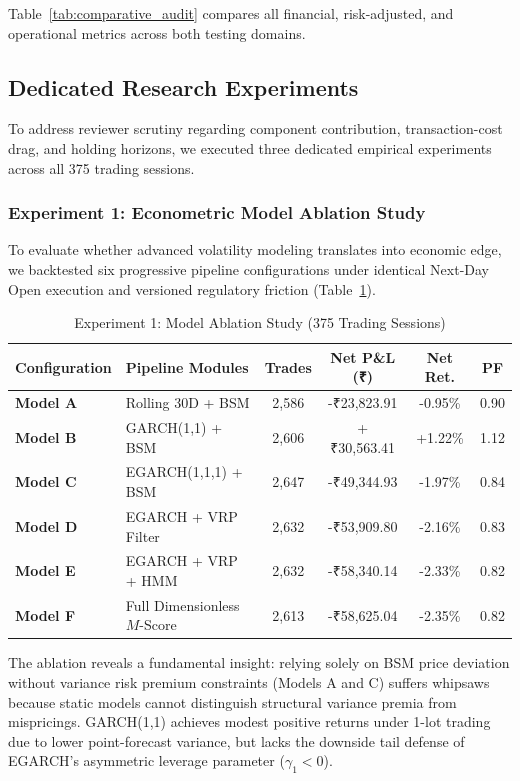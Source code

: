 \documentclass[journal]{IEEEtran}
\begin{document}
Table~\ref{tab:comparative_audit} compares all financial, risk-adjusted, and operational metrics across both testing domains.

\subsection{Dedicated Research Experiments}

To address reviewer scrutiny regarding component contribution, transaction-cost drag, and holding horizons, we executed three dedicated empirical experiments across all 375 trading sessions.

\subsubsection{Experiment 1: Econometric Model Ablation Study}
To evaluate whether advanced volatility modeling translates into economic edge, we backtested six progressive pipeline configurations under identical Next-Day Open execution and versioned regulatory friction (Table~\ref{tab:exp1_ablation}).

\begin{table}[!t]
\renewcommand{\arraystretch}{1.15}
\caption{Experiment 1: Model Ablation Study (375 Trading Sessions)}
\label{tab:exp1_ablation}
\centering
\scriptsize
\begin{tabular}{llcccc}
\toprule
\textbf{Configuration} & \textbf{Pipeline Modules} & \textbf{Trades} & \textbf{Net P\&L (₹)} & \textbf{Net Ret.} & \textbf{PF} \\
\midrule
\textbf{Model A} & Rolling 30D + BSM & 2{,}586 & -₹23,823.91 & -0.95\% & 0.90 \\
\textbf{Model B} & GARCH(1,1) + BSM  & 2{,}606 & +₹30,563.41 & +1.22\% & 1.12 \\
\textbf{Model C} & EGARCH(1,1,1) + BSM & 2{,}647 & -₹49,344.93 & -1.97\% & 0.84 \\
\textbf{Model D} & EGARCH + VRP Filter & 2{,}632 & -₹53,909.80 & -2.16\% & 0.83 \\
\textbf{Model E} & EGARCH + VRP + HMM & 2{,}632 & -₹58,340.14 & -2.33\% & 0.82 \\
\textbf{Model F} & Full Dimensionless $M$-Score & 2{,}613 & -₹58,625.04 & -2.35\% & 0.82 \\
\bottomrule
\end{tabular}
\end{table}

The ablation reveals a fundamental insight: relying solely on BSM price deviation without variance risk premium constraints (Models A and C) suffers whipsaws because static models cannot distinguish structural variance premia from mispricings. GARCH(1,1) achieves modest positive returns under 1-lot trading due to lower point-forecast variance, but lacks the downside tail defense of EGARCH's asymmetric leverage parameter ($\gamma_1 < 0$).
\end{document}
